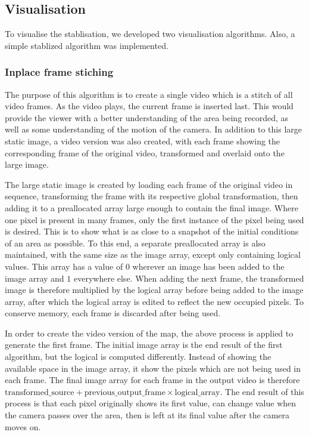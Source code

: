 \subsection{Visualisation}

To visualise the stablisation, we developed two visualisation algorithms.
Also, a simple stablized algorithm was implemented.

\subsubsection{Inplace frame stiching}

The purpose of this algorithm is to create a single video which is a stitch of all video frames.
As the video plays, the current frame is inserted last.
This would provide the viewer with a better understanding of the area being recorded,
as well as some understanding of the motion of the camera.
In addition to this large static image,
a video version was also created,
with each frame showing the corresponding frame of the original video,
transformed and overlaid onto the large image.

The large static image is created by loading each frame of the original video in sequence,
transforming the frame with its respective global transformation,
then adding it to a preallocated array large enough to contain the final image.
Where one pixel is present in many frames, only the first instance of the pixel being used is desired.
This is to show what is as close to a snapshot of the initial conditions of an area as possible.
To this end, a separate preallocated array is also maintained,
with the same size as the image array, except only containing logical values.
This array has a value of $0$ wherever an image has been added to the image array and $1$ everywhere else. 
When adding the next frame,
the transformed image is therefore multiplied by the logical array before being added to the image array,
after which the logical array is edited to reflect the new occupied pixels.
To conserve memory, each frame is discarded after being used.

In order to create the video version of the map,
the above process is applied to generate the first frame.
The initial image array is the end result of the first algorithm, but the logical is computed differently.
Instead of showing the available space in the image array,
it show the pixels which are not being used in each frame.
The final image array for each frame in the output video is therefore
$\text{transformed\_source} + \text{previous\_output\_frame} \times \text{logical\_array}$.
The end result of this process is that each pixel originally shows its first value,
can change value when the camera passes over the area,
then is left at its final value after the camera moves on.


